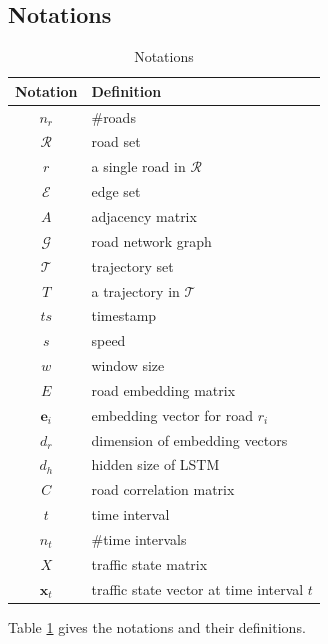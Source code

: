\subsection{Notations}
\begin{table}[htb]
    \begin{center}
        \caption{Notations}
        \label{notation_table}
        \begin{tabular}{cl}
            \toprule

            \textbf{Notation} & \textbf{Definition}                       \\

            \midrule

            $n_r$             & \#roads                                   \\
            $\mathcal R$      & road set                                  \\
            $r$               & a single road in $\mathcal R$             \\
            $\mathcal E$      & edge set                                  \\
            $A$               & adjacency matrix                          \\
            $\mathcal G$      & road network graph                        \\
            $\mathcal T$      & trajectory set                            \\
            $T$               & a trajectory in $\mathcal T$              \\
            $ts$              & timestamp                                 \\
            $s$               & speed                                     \\
            $w$               & window size                               \\
            $E$               & road embedding matrix                     \\
            $\mathbf{e}_i$    & embedding vector for road $r_i$           \\
            $d_r$             & dimension of embedding vectors            \\
            $d_h$             & hidden size of LSTM                       \\
            $C$               & road correlation matrix                   \\
            $t$               & time interval                             \\
            $n_t$             & \#time intervals                          \\
            $X$               & traffic state matrix                      \\
            $\mathbf x_t$     & traffic state vector at time interval $t$ \\

            \bottomrule
        \end{tabular}
    \end{center}
\end{table}
Table \ref{notation_table} gives the notations and their definitions.

